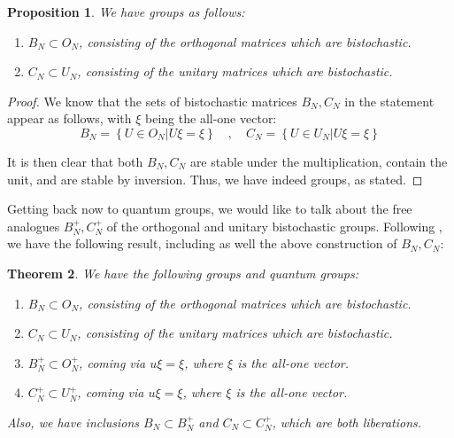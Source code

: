 \documentclass[12pt]{amsbook}
\newtheorem{theorem}{Theorem}[chapter]
\newtheorem{proposition}[theorem]{Proposition}
\begin{document}
\begin{proposition}
We have groups as follows:
\begin{enumerate}
\item $B_N\subset O_N$, consisting of the orthogonal matrices which are bistochastic.

\item $C_N\subset U_N$, consisting of the unitary matrices which are bistochastic.
\end{enumerate}
\end{proposition}

\begin{proof}
We know that the sets of bistochastic matrices $B_N,C_N$ in the statement appear as follows, with $\xi$ being the all-one vector:
$$B_N=\left\{U\in O_N\Big|U\xi=\xi\right\}\quad,\quad 
C_N=\left\{U\in U_N\Big|U\xi=\xi\right\}$$

It is then clear that both $B_N,C_N$ are stable under the multiplication, contain the unit, and are stable by inversion. Thus, we have indeed groups, as stated.
\end{proof}

Getting back now to quantum groups, we would like to talk about the free analogues $B_N^+,C_N^+$ of the orthogonal and unitary bistochastic groups. Following \cite{bsp}, we have the following result, including as well the above construction of $B_N,C_N$:

\begin{theorem}
We have the following groups and quantum groups:
\begin{enumerate}
\item $B_N\subset O_N$, consisting of the orthogonal matrices which are bistochastic.

\item $C_N\subset U_N$, consisting of the unitary matrices which are bistochastic.

\item $B_N^+\subset O_N^+$, coming via $u\xi=\xi$, where $\xi$ is the all-one vector.

\item $C_N^+\subset U_N^+$, coming via $u\xi=\xi$, where $\xi$ is the all-one vector.
\end{enumerate}
Also, we have inclusions $B_N\subset B_N^+$ and $C_N\subset C_N^+$, which are both liberations.
\end{theorem}
\end{document}
